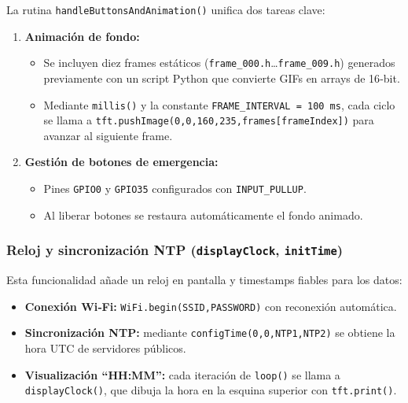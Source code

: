 \documentclass[12pt, a4paper]{article}
\begin{document}
	La rutina \texttt{handleButtonsAndAnimation()} unifica dos tareas clave:
	\begin{enumerate}
		\item \textbf{Animación de fondo:}
		\begin{itemize}
			\item Se incluyen diez frames estáticos (\texttt{frame\_000.h}…\texttt{frame\_009.h}) generados previamente con un script Python que convierte GIFs en arrays de 16‑bit.  
			\item Mediante \texttt{millis()} y la constante \texttt{FRAME\_INTERVAL = 100\,ms}, cada ciclo se llama a  
			\texttt{tft.pushImage(0,0,160,235,frames[frameIndex])} para avanzar al siguiente frame.  
		\end{itemize}
		\item \textbf{Gestión de botones de emergencia:}
		\begin{itemize}
			\item Pines \texttt{GPIO0} y \texttt{GPIO35} configurados con \texttt{INPUT\_PULLUP}.  
			\item Al liberar botones se restaura automáticamente el fondo animado.
		\end{itemize}
	\end{enumerate}
	
	
	\subsubsection{Reloj y sincronización NTP (\texttt{displayClock}, \texttt{initTime})}
	
	Esta funcionalidad añade un reloj en pantalla y timestamps fiables para los datos:
	\begin{itemize}
		\item \textbf{Conexión Wi‑Fi:} \texttt{WiFi.begin(SSID,PASSWORD)} con reconexión automática.  
		\item \textbf{Sincronización NTP:} mediante \texttt{configTime(0,0,NTP1,NTP2)} se obtiene la hora UTC de servidores públicos.  
	\item \textbf{Visualización “HH:MM”:} cada iteración de \texttt{loop()} se llama a \texttt{displayClock()}, que dibuja la hora en la esquina superior con \texttt{tft.print()}.
	\end{itemize}
	
\end{document}
